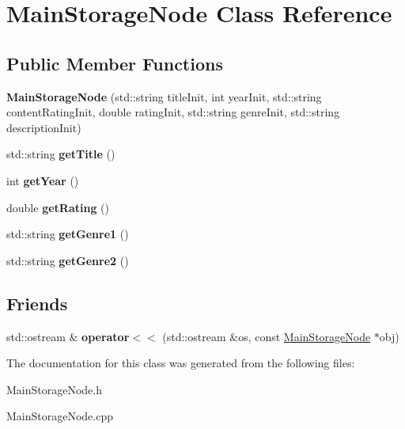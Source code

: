\hypertarget{class_main_storage_node}{}\section{Main\+Storage\+Node Class Reference}
\label{class_main_storage_node}
\subsection*{Public Member Functions}
\begin{DoxyCompactItemize}
\item 
\mbox{\label{class_main_storage_node_a89ad4f91a481aa79ac58a299932c6d54}} 
{\bfseries Main\+Storage\+Node} (std\+::string title\+Init, int year\+Init, std\+::string content\+Rating\+Init, double rating\+Init, std\+::string genre\+Init, std\+::string description\+Init)
\item 
\mbox{\label{class_main_storage_node_aa088226c953fce886abb5bbd67ede0be}} 
std\+::string {\bfseries get\+Title} ()
\item 
\mbox{\label{class_main_storage_node_a82abc37501d50c8dd97cef8d4ea7a757}} 
int {\bfseries get\+Year} ()
\item 
\mbox{\label{class_main_storage_node_a1afeaa9e324a1c30bcc5b557ae1522ea}} 
double {\bfseries get\+Rating} ()
\item 
\mbox{\label{class_main_storage_node_a06dccc8950e10fcdc74704cbcc2db5ed}} 
std\+::string {\bfseries get\+Genre1} ()
\item 
\mbox{\label{class_main_storage_node_a462a8ce932acaf3c08dffbbdd4e91338}} 
std\+::string {\bfseries get\+Genre2} ()
\end{DoxyCompactItemize}
\subsection*{Friends}
\begin{DoxyCompactItemize}
\item 
\mbox{\label{class_main_storage_node_ab4c8d839103818503935eeb693572f86}} 
std\+::ostream \& {\bfseries operator$<$$<$} (std\+::ostream \&os, const \hyperlink{class_main_storage_node}{Main\+Storage\+Node} $\ast$obj)
\end{DoxyCompactItemize}


The documentation for this class was generated from the following files\+:\begin{DoxyCompactItemize}
\item 
Main\+Storage\+Node.\+h\item 
Main\+Storage\+Node.\+cpp\end{DoxyCompactItemize}
